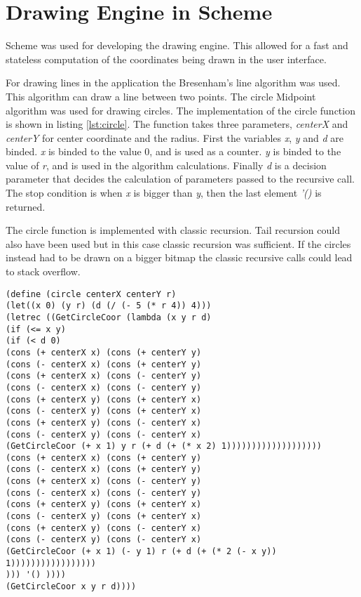 \FloatBarrier

\section{Drawing Engine in Scheme}
Scheme was used for developing the drawing engine. This allowed for a fast and stateless computation of the coordinates being drawn in the user interface.
 

For drawing lines in the application the Bresenham’s line algorithm was used. This algorithm can draw a line between two points. The circle Midpoint algorithm was used for drawing circles. The implementation of the circle function is shown in listing \ref{lst:circle}. The function takes three parameters, \emph{centerX	} and \emph{centerY} for center coordinate and the radius. First the variables \emph{x}, \emph{y} and \emph{d} are binded. \emph{x} is binded to the value 0, and is used as a counter. \emph{y} is binded to the value of \emph{r}, and is used in the algorithm calculations. Finally \emph{d} is  a decision parameter that decides the calculation of parameters passed to the recursive call. The stop condition is when \emph{x} is bigger than \emph{y}, then the last element \emph{'()} is returned.
	
The circle function is implemented with classic recursion. Tail recursion could also have been used but in this case classic recursion was sufficient. If the circles instead had to be drawn on a bigger bitmap the classic recursive calls could lead to stack overflow.

\begin{lstlisting}[caption={Scheme function circle}, label=lst:circle]
(define (circle centerX centerY r)
(let((x 0) (y r) (d (/ (- 5 (* r 4)) 4)))
(letrec ((GetCircleCoor (lambda (x y r d)
(if (<= x y)
(if (< d 0)    
(cons (+ centerX x) (cons (+ centerY y)                                                
(cons (- centerX x) (cons (+ centerY y)
(cons (+ centerX x) (cons (- centerY y)         
(cons (- centerX x) (cons (- centerY y)
(cons (+ centerX y) (cons (+ centerY x)
(cons (- centerX y) (cons (+ centerY x)
(cons (+ centerX y) (cons (- centerY x)
(cons (- centerX y) (cons (- centerY x)  
(GetCircleCoor (+ x 1) y r (+ d (+ (* x 2) 1)))))))))))))))))))
(cons (+ centerX x) (cons (+ centerY y)                                                
(cons (- centerX x) (cons (+ centerY y)
(cons (+ centerX x) (cons (- centerY y)         
(cons (- centerX x) (cons (- centerY y)
(cons (+ centerX y) (cons (+ centerY x)
(cons (- centerX y) (cons (+ centerY x)
(cons (+ centerX y) (cons (- centerY x)
(cons (- centerX y) (cons (- centerY x)  
(GetCircleCoor (+ x 1) (- y 1) r (+ d (+ (* 2 (- x y)) 1)))))))))))))))))
))) '() ))))
(GetCircleCoor x y r d))))   
\end{lstlisting}

